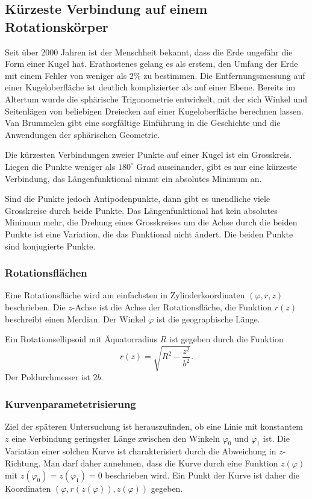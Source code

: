 %
%
\subsection{Kürzeste Verbindung auf einem Rotationskörper}
Seit über 2000 Jahren ist der Menschheit bekannt, dass die Erde
ungefähr die Form einer Kugel hat.
Erathostenes gelang es als erstem, den Umfang der Erde mit
einem Fehler von weniger als $2\%$ zu bestimmen.
Die Entfernungsmessung auf einer Kugeloberfläche ist deutlich
komplizierter als auf einer Ebene.
Bereits im Altertum wurde die sphärische Trigonometrie entwickelt,
mit der sich Winkel und Seitenlägen von beliebigen Dreiecken auf
einer Kugeloberfläche berechnen lassen.
Van Brummelen \cite{buch:heavenly} gibt eine sorgfältige Einführung
in die Geschichte und die Anwendungen der sphärischen Geometrie.

\begin{beispiel}
Die kürzesten Verbindungen zweier Punkte auf einer Kugel ist ein
Grosskreis.
Liegen die Punkte weniger als $180^\circ$ Grad auseinander, gibt es
nur eine kürzeste Verbindung, das Längenfunktional nimmt ein
absolutes Minimum an.

Sind die Punkte jedoch Antipodenpunkte, dann gibt es unendliche viele
Grosskreise durch beide Punkte.
Das Längenfunktional hat kein absolutes Minimum mehr, die Drehung eines
Grosskreises um die Achse durch die beiden Punkte ist eine Variation,
die das Funktional nicht ändert.
Die beiden Punkte sind konjugierte Punkte.
\end{beispiel}

%
%
\subsubsection{Rotationsflächen}
Eine Rotationsfläche wird am einfachsten in Zylinderkoordinaten
$(\varphi,r,z)$
beschrieben.
Die $z$-Achse ist die Achse der Rotationsfläche, die Funktion $r(z)$
beschreibt einen Merdian.
Der Winkel $\varphi$ ist die geographische Länge.

\begin{beispiel}
Ein Rotationsellipsoid mit Äquatorradius $R$ ist gegeben durch die Funktion
\[
r(z)
=
\sqrt{R^2-\frac{z^2}{b^2}}.
\]
Der Poldurchmesser ist $2b$.
\end{beispiel}

%
%
\subsubsection{Kurvenparametetrisierung}
Ziel der späteren Untersuchung ist herauszufinden, ob eine Linie
mit konstantem $z$ eine Verbindung geringster Länge zwischen den
Winkeln $\varphi_0$ und $\varphi_1$ ist.
Die Variation einer solchen Kurve ist charakterisiert durch die
Abweichung in $z$-Richtung.
Man darf daher annehmen, dass die Kurve durch eine Funktion $z(\varphi)$
mit $z(\varphi_0)=z(\varphi_1)=0$ beschrieben wird.
Ein Punkt der Kurve ist daher die Koordinaten
$(\varphi, r(z(\varphi)), z(\varphi))$
gegeben.

